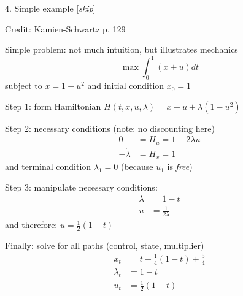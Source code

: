 \documentclass[11pt, aspectratio=169]{beamer}
\newenvironment{witemize}{\itemize\addtolength{\itemsep}{10pt}}{\enditemize}
\begin{document}
\begin{frame}{4. Simple example [\textit{skip}]}
\begin{witemize}

\item Credit: Kamien-Schwartz p. 129

\item Simple problem: not much intuition, but illustrates mechanics
\begin{equation*}
	\max \int_0^1 (x + u) dt 
\end{equation*}
subject to $\dot x = 1 - u^2$ and initial condition $x_0 = 1$

\item Step 1: form Hamiltonian $H(t, x, u, \lambda) = x + u + \lambda (1 - u^2)$

\item Step 2: necessary conditions (note: no discounting here)
\begin{align*}
	0 &= H_u = 1 - 2 \lambda u \\
	- \dot \lambda &= H_x = 1
\end{align*}
and terminal condition $\lambda_1 = 0$ (because $u_1$ is \textit{free})

\end{witemize}
\end{frame}



\begin{frame}{}
\begin{witemize}

\item Step 3: manipulate necessary conditions:
\begin{align*}
	\lambda &= 1 - t \\
	u &= \frac{1}{2 \lambda}
\end{align*}
and therefore: $u = \frac{1}{2} (1 - t)$

\item Finally: solve for all paths (control, state, multiplier)
\begin{align*}
	x_t &= t - \frac{1}{4} (1 - t) + \frac{5}{4} \\
	\lambda_t &= 1 - t \\
	u_t &= \frac{1}{2} (1 - t)
\end{align*}

\end{witemize}
\end{frame}
\end{document}

